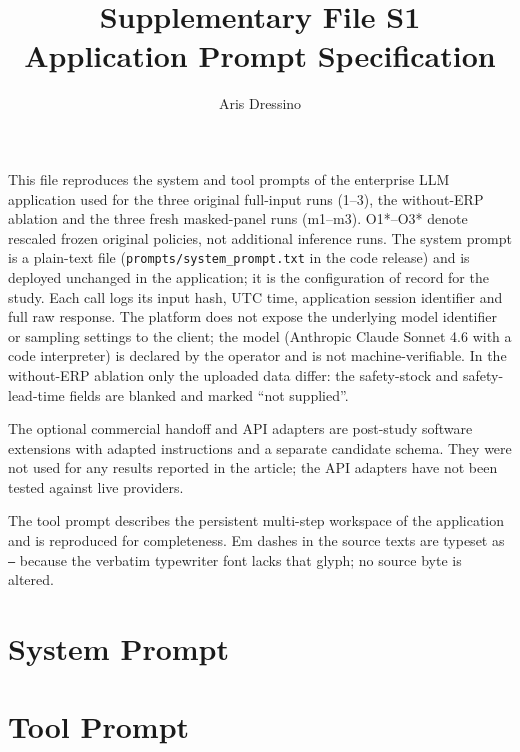 \documentclass[11pt]{article}
\title{Supplementary File S1\\Application Prompt Specification}
\author{Aris Dressino}
\date{}
\begin{document}
\maketitle

\noindent
This file reproduces the system and tool prompts of the enterprise LLM application
used for the three original full-input runs (1--3), the without-ERP ablation and the
three fresh masked-panel runs (m1--m3). O1*--O3* denote rescaled frozen original
policies, not additional inference runs. The system prompt is a plain-text file
(\texttt{prompts/system\_prompt.txt} in the code release) and is deployed unchanged in the
application; it is the configuration of record for the study. Each call logs its input
hash, UTC time, application session identifier and full raw response. The platform does
not expose the underlying model identifier or sampling settings to the client; the model
(Anthropic Claude Sonnet 4.6 with a code interpreter) is declared by the operator and
is not machine-verifiable. In the without-ERP ablation only the uploaded data differ:
the safety-stock and safety-lead-time fields are blanked and marked ``not supplied''.

\noindent
The optional commercial handoff and API adapters are post-study software extensions
with adapted instructions and a separate candidate schema. They were not used for
any results reported in the article; the API adapters have not been tested against
live providers.

\bigskip
\noindent
The tool prompt describes the persistent multi-step workspace of the application and
is reproduced for completeness. Em dashes in the source texts are typeset as
\texttt{---} because the verbatim typewriter font lacks that glyph; no source byte is
altered.

\section*{System Prompt}

\clearpage
\section*{Tool Prompt}
\end{document}
